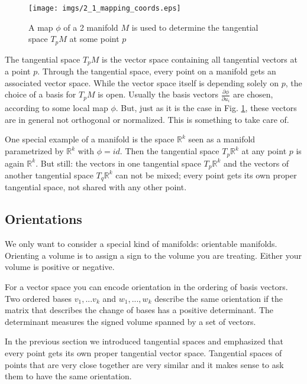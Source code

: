 \begin{figure}[tb]
\begin{center}
\texttt{[image: imgs/2\_1\_mapping\_coords.eps]}
\end{center}
\caption{A map $\phi$ of a 2 manifold $M$ is used to determine the tangential space $T_{p}M$ at some point $p$}
\label{fig::2_1_mapping_coords}
\end{figure}

The tangential space $T_p M$ is the vector space containing all tangential vectors at a point $p$. Through the tangential space, every point on a manifold gets an associated vector space. While the vector space itself is depending solely on $p$, the choice of a basis for $T_pM$ is open. Usually  the basis vectors $\frac{\partial \phi}{\partial u_i}$  are chosen, according to some local map $\phi$. But, just as it is the case in Fig. \ref{fig::2_1_mapping_coords}, these vectors are in general not orthogonal or normalized. This is something to take care of.

One special example of a manifold is  the space $\mathbb R^k$ seen as a manifold parametrized by $\mathbb R^k$ with $\phi = id$. Then the tangential space $T_p \mathbb R^k$ at any point $p$ is again $\mathbb R^k$. But still: the vectors in one tangential space $T_p \mathbb R^k$ and the vectors of another tangential space $T_q \mathbb R^k$ can not be mixed; every point gets its own proper tangential space, not shared with any other point.
		
\subsection{Orientations}
We only want to consider a special kind of manifolds: orientable manifolds. Orienting a volume is to assign a sign to the volume you are treating. Either your volume is positive or negative. 

For a vector space you can encode orientation in the ordering of basis vectors. Two ordered bases $v_1,...v_k$ and $w_1,...,w_k$ describe the same orientation if the matrix that describes the change of bases has a positive determinant. The determinant measures the signed volume spanned by a set of vectors.

In the previous section we introduced tangential spaces and emphasized that every point gets its own proper tangential vector space. Tangential spaces of points that are very close together are very similar and it makes sense to ask them to have the same orientation.

